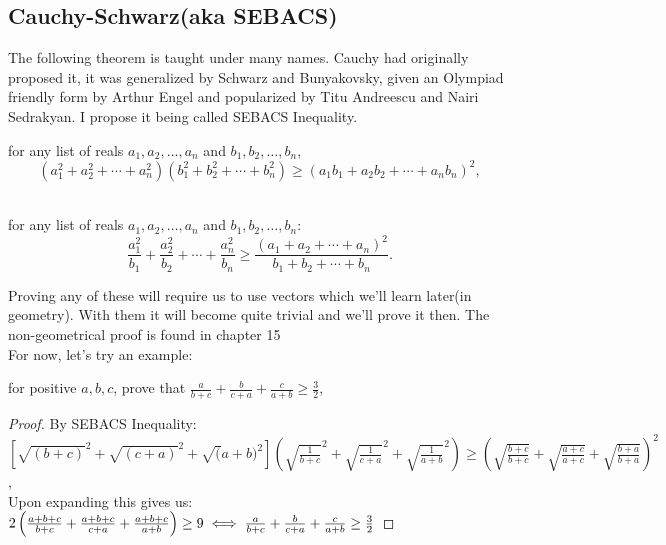 \subsection{Cauchy-Schwarz(aka SEBACS)}
The following theorem is taught under many names. Cauchy had originally proposed it, it was generalized by Schwarz and Bunyakovsky, given an Olympiad friendly form by Arthur Engel and popularized by Titu Andreescu and Nairi Sedrakyan.  I propose it being called SEBACS Inequality.
\begin{theorem}
    for any list of reals $a_1, a_2, \ldots, a_n$ and $b_1, b_2, \ldots, b_n$,\[(a_1^2 + a_2^2 + \cdots + a_n^2)(b_1^2 + b_2^2 + \cdots + b_n^2) \geq (a_1b_1 + a_2b_2 + \cdots + a_nb_n)^2,\]\\
\end{theorem}
\begin{theorem}
for any list of reals $a_1, a_2, \ldots, a_n$ and $b_1, b_2, \ldots, b_n$:\\
\[\frac{ a_1^2 } { b_1 } + \frac{ a_2 ^2 } { b_2 } + \cdots + \frac{ a_n ^2 } { b_n } \geq \frac{ (a_1 + a_2 + \cdots+ a_n ) ^2 } { b_1 + b_2 + \cdots+ b_n }.\] 
\end{theorem}
Proving any of these will require us to use vectors which we'll learn later(in geometry). With them it will become quite trivial and we'll prove it then. The non-geometrical proof is found in chapter 15\\
For now, let's try an example:
\begin{example}
    for positive $a, b, c$, prove that
$\frac{a}{b+c} + \frac{b}{c+a} + \frac{c}{a+b} \ge \frac{3}{2}$,
\end{example}
\begin{proof}
    By SEBACS Inequality:\\
    $[\sqrt{(b+c)}^2 + \sqrt{(c+a)}^2 + \sqrt(a+b)^2]\left( \sqrt{\frac{1}{b+c}}^2 + \sqrt{\frac{1}{c+a}}^2 + \sqrt{\frac{1}{a+b}}^2 \right) \geq (\sqrt{\frac{b+c}{b+c}}+\sqrt{\frac{a+c}{a+c}}+\sqrt{\frac{b+a}{b+a}})^2$,\\
    Upon expanding this gives us:\\
    $2\left( \frac{a+b+c}{b+c} + \frac{a+b+c}{c+a} + \frac{a+b+c}{a+b} \right) \geq 9\\
   \iff \frac{a}{b+c} + \frac{b}{c+a} + \frac{c}{a+b} \ge \frac{3}{2}$
\end{proof}
